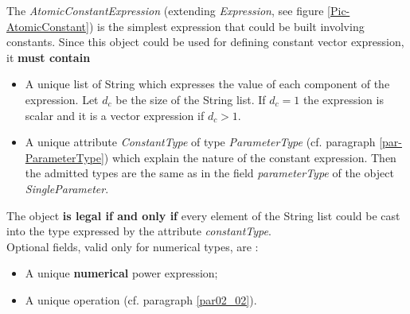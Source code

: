 \documentclass[a4paper,11pt] {article}
\begin{document}
The {\it AtomicConstantExpression} (extending {\it Expression}, see figure \ref{Pic-AtomicConstant})
is the simplest expression that could be built involving constants. Since this object could be used
for defining constant vector expression, it {\bf must contain}
\begin{itemize}
\item A unique list of String which expresses the value of each component of the expression. Let
$d_c$ be the size of the String list. If $d_c=1$ the expression is scalar and it is a vector
expression if $d_c>1$.
\item A unique attribute {\it ConstantType} of type {\it ParameterType} (cf. paragraph
\ref{par-ParameterType}) which explain the nature of the constant expression. Then the admitted
types are the same as in the field {\it parameterType} of the object {\it SingleParameter}.
\end{itemize}
The object {\bf is legal if and only if} every element of the String list could be cast into the
type expressed by the attribute {\it constantType}.\\

Optional fields, valid only for numerical types, are : 
\begin{itemize}
\item A unique {\bf numerical} power expression;
\item A unique operation (cf. paragraph \ref{par02_02}).
\end{itemize}
\end{document}
